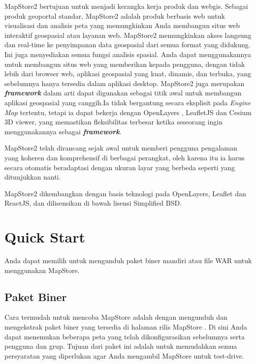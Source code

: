 \documentclass[]{book}
\begin{document}
MapStore2 bertujuan untuk menjadi kerangka kerja produk dan webgis. Sebagai produk geoportal standar, MapStore2 adalah produk berbasis web untuk visualisasi dan analisis peta yang memungkinkan Anda membangun situs web interaktif geospasial atau layanan web. MapStore2 memungkinkan akses langsung dan real-time ke penyimpanan data geospasial dari semua format yang didukung. Ini juga menyediakan semua fungsi analisis spasial. Anda dapat menggunakannya untuk membangun situs web yang memberikan kepada pengguna, dengan tidak lebih dari browser web, aplikasi geospasial yang kuat, dinamis, dan terbuka, yang sebelumnya hanya tersedia dalam aplikasi desktop. MapStore2 juga merupakan \textbf{\emph{framework}} dalam arti dapat digunakan sebagai titik awal untuk membangun aplikasi geospasial yang canggih.Ia tidak bergantung secara eksplisit pada \emph{Engine Map} tertentu, tetapi ia dapat bekerja dengan OpenLayers , LeafletJS dan Cesium 3D viewer, yang memastikan fleksibilitas terbesar ketika seseorang ingin menggunakannya sebagai \textbf{\emph{framework}}.

MapStore2 telah dirancang sejak awal untuk memberi pengguna pengalaman yang koheren dan komprehensif di berbagai perangkat, oleh karena itu ia harus secara otomatis beradaptasi dengan ukuran layar yang berbeda seperti yang ditunjukkan nanti.

MapStore2 dikembangkan dengan basis teknologi pada OpenLayers, Leaflet dan ReactJS, dan dilisensikan di bawah lisensi Simplified BSD.

\hypertarget{quick-start}{%
\section{Quick Start}\label{quick-start}}

Anda dapat memilih untuk mengunduh paket biner mandiri atau file WAR untuk menggunakan MapStore.

\hypertarget{paket-biner}{%
\subsection{Paket Biner}\label{paket-biner}}

Cara termudah untuk mencoba MapStore adalah dengan mengunduh dan mengekstrak paket biner yang tersedia di halaman rilis MapStore . Di sini Anda dapat menemukan beberapa peta yang telah dikonfigurasikan sebelumnya serta pengguna dan grup. Tujuan dari paket ini adalah untuk memudahkan semua persyaratan yang diperlukan agar Anda mengambil MapStore untuk test-drive.
\end{document}
